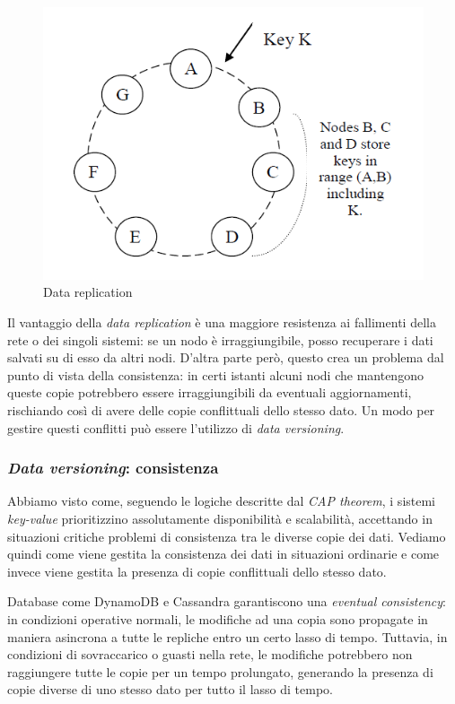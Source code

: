 \begin{figure}[!ht]
    \centering
    \includegraphics[width=.6\textwidth]{images/ringreplication.png}
    \caption{Data replication}
    \label{fig:rep}
\end{figure}

Il vantaggio della \textit{data replication} è una maggiore resistenza ai fallimenti della rete o dei singoli sistemi: se un nodo è irraggiungibile, posso recuperare i dati salvati su di esso da altri nodi. D'altra parte però, questo crea un problema dal punto di vista della consistenza: in certi istanti alcuni nodi che mantengono queste copie potrebbero essere irraggiungibili da eventuali aggiornamenti, rischiando così di avere delle copie conflittuali dello stesso dato. Un modo per gestire questi conflitti può essere l'utilizzo di \textit{data versioning}.

\subsubsection{\textit{Data versioning}: consistenza}
Abbiamo visto come, seguendo le logiche descritte dal \textit{CAP theorem}, i sistemi \textit{key-value} prioritizzino assolutamente disponibilità e scalabilità, accettando in situazioni critiche problemi di consistenza tra le diverse copie dei dati. Vediamo quindi come viene gestita la consistenza dei dati in situazioni ordinarie e come invece viene gestita la presenza di copie conflittuali dello stesso dato.

Database come DynamoDB e Cassandra garantiscono una \textit{eventual consistency}: in condizioni operative normali, le modifiche ad una copia sono propagate in maniera asincrona a tutte le repliche entro un certo lasso di tempo. Tuttavia, in condizioni di sovraccarico o guasti nella rete, le modifiche potrebbero non raggiungere tutte le copie per un tempo prolungato, generando la presenza di copie diverse di uno stesso dato per tutto il lasso di tempo.

